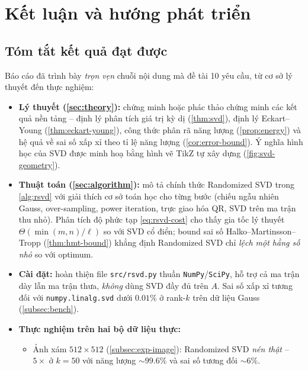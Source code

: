 \section{Kết luận và hướng phát triển}\label{sec:conclusion}

\subsection{Tóm tắt kết quả đạt được}\label{subsec:summary}

Báo cáo đã trình bày \emph{trọn vẹn} chuỗi nội dung mà đề tài 10 yêu cầu, từ
cơ sở lý thuyết đến thực nghiệm:

\begin{itemize}
    \item \textbf{Lý thuyết (\cref{sec:theory}):} chứng minh hoặc phác thảo
    chứng minh các kết quả nền tảng -- định lý phân tích giá trị kỳ dị
    (\cref{thm:svd}), định lý Eckart--Young (\cref{thm:eckart-young}), công
    thức phân rã năng lượng (\cref{prop:energy}) và hệ quả về sai số xấp xỉ
    theo tỉ lệ năng lượng (\cref{cor:error-bound}). Ý nghĩa hình học của SVD
    được minh hoạ bằng hình vẽ TikZ tự xây dựng (\cref{fig:svd-geometry}).

    \item \textbf{Thuật toán (\cref{sec:algorithm}):} mô tả chính thức
    Randomized SVD trong \cref{alg:rsvd} với giải thích cơ sở toán học cho
    từng bước (chiếu ngẫu nhiên Gauss, over-sampling, power iteration, trực
    giao hóa QR, SVD trên ma trận thu nhỏ). Phân tích độ phức tạp
    \eqref{eq:rsvd-cost} cho thấy gia tốc lý thuyết $\Theta(\min(m,n)/\ell)$
    so với SVD cổ điển; bound sai số Halko--Martinsson--Tropp
    (\cref{thm:hmt-bound}) khẳng định Randomized SVD chỉ \emph{lệch một hằng
    số nhỏ} so với optimum.

    \item \textbf{Cài đặt:} hoàn thiện file \texttt{src/rsvd.py} thuần
    \texttt{NumPy}/\texttt{SciPy}, hỗ trợ cả ma trận dày lẫn ma trận thưa,
    \emph{không} dùng SVD đầy đủ trên $A$. Sai số xấp xỉ tương đối với
    \texttt{numpy.linalg.svd} dưới $0.01\%$ ở rank-$k$ trên dữ liệu Gauss
    (\cref{subsec:bench}).

    \item \textbf{Thực nghiệm trên hai bộ dữ liệu thực:}
    \begin{itemize}
        \item Ảnh xám $512\times 512$ (\cref{subsec:exp-image}):
        Randomized SVD \emph{nén thật} -- $5\times$ ở $k = 50$ với năng lượng
        $\sim 99.6\%$ và sai số tương đối $\sim 6\%$.


\end{itemize}
\end{itemize}
